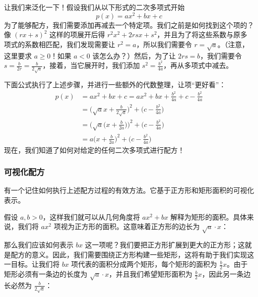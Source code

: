让我们来泛化一下！假设我们从以下形式的二次多项式开始
\[p(x) = ax^2 + bx + c\]
为了能够配方，我们需要添加再减去一个特定项。我们之前是如何找到这个项的？像 $(rx + s)^2$ 这样的项展开后得 $r^2x^2 + 2rsx + s^2$，并且为了将这些系数与原多项式的系数相匹配，我们发现需要让 $r^2 = a$，所以我们需要令 $r = \sqrt{a}$。（注意，这里要求 $a \ge 0$！如果 $a<0$ 该怎么办？）然后，为了让 $2rs = b$，我们需要令 $s = \frac{b}{2r} = \frac{b}{2\sqrt{a}}$，接着，当它展开时，我们添加 $s^2 = \frac{b^2}{4a}$，再从多项式中减去。

下面公式执行了上述步骤，并进行一些额外的代数整理，让项“更好看”：
\begin{align*}
    p(x) &= ax^2 + bx + c = ax^2 + bx + \frac{b^2}{4a} + c - \frac{b^2}{4a}\\
    &=\Big(\sqrt{a}x+\frac{b}{2\sqrt{a}}\Big)^2+\Big(c- \frac{b^2}{4a}\Big)\\
    &=\Big(\sqrt{a}\Big(x+\frac{b}{2a}\Big)\Big)^2+\Big(c- \frac{b^2}{4a}\Big)\\
    &=a\Big(x+\frac{b}{2a}\Big)^2+\Big(c- \frac{b^2}{4a}\Big)
\end{align*}
现在，我们知道了如何对给定的任何二次多项式进行配方！

\subsubsection*{可视化配方}

有一个记住如何执行上述配方过程的有效方法。它基于正方形和矩形面积的可视化表示。

假设 $a, b>0$，这样我们就可以从几何角度将 $ax^2+bx$ 解释为矩形的面积。具体来说，我们将 $ax^2$ 项视为正方形的面积。这意味着正方形的边长为 $\sqrt{a} \cdot x$：

\begin{center}
\end{center}

那么我们应该如何表示 $bx$ 这一项呢？我们要把正方形扩展到更大的正方形；这就是配方的意义。因此，我们需要围绕正方形构建一些矩形，这将有助于我们实现这一目标。让我们将 $bx$ 项代表的面积分成两个矩形，每个矩形的面积为 $\frac{b}{2}x$。由于矩形必须有一条边的长度为 $\sqrt{a} \cdot x$，并且我们希望矩形面积为 $\frac{b}{2}x$，因此另一条边长必然为 $\frac{b}{2\sqrt{a}}$：

